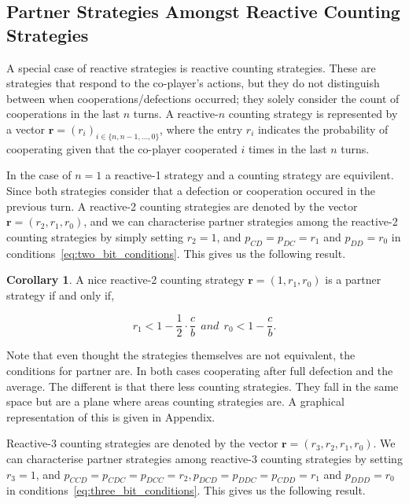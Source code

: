 \documentclass{article}
\theoremstyle{definition}
\newtheorem{corollary}{Corollary}[theorem]
\begin{document}
\subsection{Partner Strategies Amongst Reactive Counting Strategies}

A special case of reactive strategies is reactive counting strategies. These are
strategies that respond to the co-player's actions, but they do not distinguish
between when cooperations/defections occurred; they solely consider the count of
cooperations in the last $n$ turns. A reactive-$n$ counting strategy is represented
by a vector $\mathbf{r}=(r_i)_{i \in \{n, n -1, \dots, 0\}}$, where the entry \(r_i\)
indicates the probability of cooperating given that the co-player cooperated
\(i\) times in the last \(n\) turns.

In the case of $n=1$ a reactive-1 strategy and a counting strategy are
equivilent. Since both strategies consider that a defection or cooperation
occured in the previous turn. A reactive-2 counting strategies are denoted by
the vector $\mathbf{r}=(r_2, r_1, r_0)$, and we can characterise partner
strategies among the reactive-2 counting strategies by simply setting $r_2 = 1$,
and $p_{CD} = p_{DC} = r_1$ and $p_{DD} = r_0$ in
conditions~\eqref{eq:two_bit_conditions}. This gives us the following result.

\begin{corollary}
A nice reactive-2 counting strategy $\mathbf{r} = (1, r_1, r_0)$ is a partner strategy if and only if,

\begin{equation}\label{eq:counting_two_bit_conditions}
  \displaystyle r_1 < 1-\frac{1}{2} \cdot \frac{c}{b} ~~and~~ r_0 < 1\!-\! \frac{c}{b}.
\end{equation}
\end{corollary}

Note that even thought the strategies themselves are not equivalent, the
conditions for partner are. In both cases cooperating after full defection and
the average. The different is that there less counting strategies. They fall in
the same space but are a plane where areas counting strategies are. A graphical
representation of this is given in Appendix.


Reactive-3 counting strategies are denoted by the vector $\mathbf{r}=(r_3,
r_2, r_1, r_0)$. We can characterise partner strategies among reactive-3
counting strategies by setting $r_3 = 1$, and $p_{CCD} = p_{CDC} = p_{DCC} =
r_2, p_{DCD} = p_{DDC} = p_{CDD} = r_1$ and $p_{DDD} = r_0$ in
conditions~\eqref{eq:three_bit_conditions}. This gives us the following result.
\end{document}
